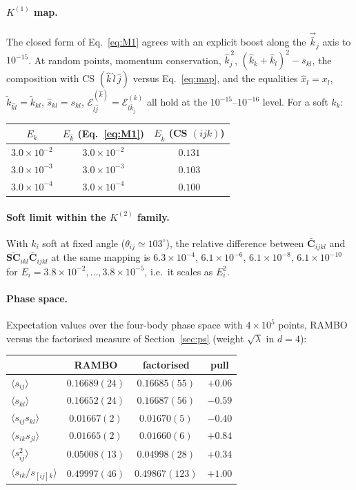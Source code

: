 \documentclass[11pt,a4paper]{article}
\newcommand{\bbC}[1]{\bar{\mathbf C}_{#1}}
\newcommand{\bbSC}[1]{\bar{\mathbf{SC}}_{#1}}
\newcommand{\jb}{\bar k_{j}}
\newcommand{\jh}{\hat k_{j}}
\newcommand{\kh}{\hat k_{k}}
\newcommand{\lh}{\hat k_{l}}
\newcommand{\E}[3]{\mathcal E^{(#1)}_{#2#3}}
\begin{document}
\paragraph{$K^{(1)}$ map.} The closed form of Eq.~\eqref{eq:M1} agrees with an explicit boost along the
$\vec{\bar k}_j$ axis to $10^{-15}$. At random points, momentum conservation, $\jh^{\,2}$,
$(\kh+\lh)^2-s_{kl}$, the composition with CS $(\hat k\,\hat l\,\hat j)$ versus Eq.~\eqref{eq:map}, and the
equalities $\hat x_l=x_l$, $\tilde k_{\hat k\hat l}=\tilde k_{kl}$, $\hat s_{kl}=s_{kl}$,
$\mathcal E^{(\hat k)}_{\hat l\hat j}=\E{k}{l}{\jb}$ all hold at the $10^{-15}$--$10^{-16}$ level.
For a soft $k_k$:
\begin{center}
\begin{tabular}{ccc}\toprule
$E_k$ & $E_{\hat k}$ (Eq.~\eqref{eq:M1}) & $E_{\tilde k}$ (CS $(ijk)$)\\\midrule
$3.0\times10^{-2}$ & $3.0\times10^{-2}$ & $0.131$\\
$3.0\times10^{-3}$ & $3.0\times10^{-3}$ & $0.103$\\
$3.0\times10^{-4}$ & $3.0\times10^{-4}$ & $0.100$\\\bottomrule
\end{tabular}
\end{center}

\paragraph{Soft limit within the $K^{(2)}$ family.} With $k_i$ soft at fixed angle
($\theta_{ij}\simeq103^\circ$), the relative difference between $\bbC{ijkl}$ and $\bbSC{ikl}\bbC{ijkl}$
at the same mapping is $6.3\times10^{-4}$, $6.1\times10^{-6}$, $6.1\times10^{-8}$, $6.1\times10^{-10}$
for $E_i=3.8\times10^{-2},\dots,3.8\times10^{-5}$, i.e.\ it scales as $E_i^2$.

\paragraph{Phase space.} Expectation values over the four-body phase space with $4\times10^5$ points,
RAMBO versus the factorised measure of Section~\ref{sec:ps} (weight $\sqrt{\lambda}$ in $d=4$):
\begin{center}
\begin{tabular}{lccc}\toprule
& RAMBO & factorised & pull\\\midrule
$\langle s_{ij}\rangle$ & $0.16689(24)$ & $0.16685(55)$ & $+0.06$\\
$\langle s_{kl}\rangle$ & $0.16652(24)$ & $0.16687(56)$ & $-0.59$\\
$\langle s_{ij}s_{kl}\rangle$ & $0.01667(2)$ & $0.01670(5)$ & $-0.40$\\
$\langle s_{ik}s_{jl}\rangle$ & $0.01665(2)$ & $0.01660(6)$ & $+0.84$\\
$\langle s_{ij}^2\rangle$ & $0.05008(13)$ & $0.04998(28)$ & $+0.34$\\
$\langle s_{ik}/s_{[ij]k}\rangle$ & $0.49997(46)$ & $0.49867(123)$ & $+1.00$\\\bottomrule
\end{tabular}
\end{center}
\end{document}
